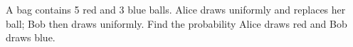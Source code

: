 A bag contains 5 red and 3 blue balls. Alice draws uniformly and replaces her ball; Bob then draws uniformly. Find the probability Alice draws red and Bob draws blue.
